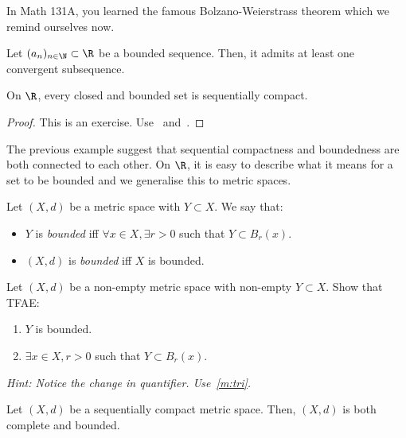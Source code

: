 In Math 131A, you learned the famous Bolzano-Weierstrass theorem which we remind ourselves now.
\begin{thm}
\label{thm:bw}
Let $(a_n)_{n\in\N}\subset \R$ be a bounded sequence. Then, it admits at least one convergent subsequence.
\end{thm}
\begin{cor}
	\label{cor:bw}
On $\R$, every closed and bounded set is sequentially compact.
\end{cor}
\begin{proof}
	This is an exercise. Use~ and~.
\end{proof}
The previous example suggest that sequential compactness and boundedness are both connected to each other. On $\R$, it is easy to describe what it means for a set to be bounded and we generalise this to metric spaces.
\begin{defn}[Bounded]
Let $(X,d)$ be a metric space with $Y\subset X$. We say that:
\begin{itemize}
	\item $Y$ is \textit{bounded} iff $\forall x\in X, \exists r>0$ such that $Y\subset B_r(x)$.
	\item $(X,d)$ is \textit{bounded} iff $X$ is bounded.
\end{itemize}
\end{defn}
\begin{ex}
Let $(X,d)$ be a non-empty metric space with non-empty $Y\subset X$. Show that TFAE:
\begin{enumerate}
	\item $Y$ is bounded.
	\item $\exists x\in X, r>0$ such that $Y\subset B_r(x)$.
\end{enumerate}
\textit{Hint: Notice the change in quantifier. Use~\ref{m:tri}.}
\end{ex}
\begin{prop}
	\label{prop:seq_cpct_cmpl_bdd}
Let $(X,d)$ be a sequentially compact metric space. Then, $(X,d)$ is both complete and bounded.
\end{prop}

